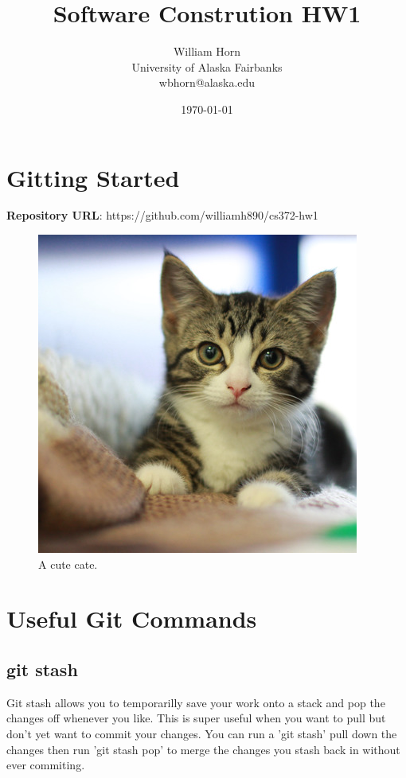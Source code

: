 \documentclass{article}
\begin{document}
\title{Software Constrution HW1}
\author{William Horn\\University of Alaska Fairbanks\\wbhorn@alaska.edu}
\date{\today}
\maketitle

\section{Gitting Started}
\textbf{Repository URL}: https://github.com/williamh890/cs372-hw1 \\

\begin{figure}[h!]
  \includegraphics[width=\linewidth]{cat.jpg}
  \caption{A cute cate.}
  \label{fig:cat1}
\end{figure}

\section{Useful Git Commands}
\subsection{git stash}
Git stash allows you to temporarilly save your work onto a stack and pop the changes off whenever you like.
This is super useful when you want to pull but don't yet want to commit your changes. You can run a 'git stash' pull
down the changes then run 'git stash pop' to merge the changes you stash back in without ever commiting.
\end{document}
